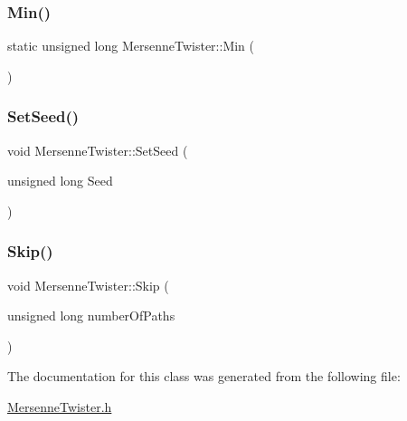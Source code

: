\subsubsection{\texorpdfstring{Min()}{Min()}}
{\footnotesize\ttfamily static unsigned long Mersenne\+Twister\+::\+Min (\begin{DoxyParamCaption}{ }\end{DoxyParamCaption})\hspace{0.3cm}{\ttfamily [static]}}

\hypertarget{classMersenneTwister_a92f4f907dad1c87f60f668351cdf174d}{}\label{classMersenneTwister_a92f4f907dad1c87f60f668351cdf174d} 
\subsubsection{\texorpdfstring{Set\+Seed()}{SetSeed()}}
{\footnotesize\ttfamily void Mersenne\+Twister\+::\+Set\+Seed (\begin{DoxyParamCaption}\item[{unsigned long}]{Seed }\end{DoxyParamCaption})}

\hypertarget{classMersenneTwister_acadedcfe8e29f89b5d6f6dc3e82127cc}{}\label{classMersenneTwister_acadedcfe8e29f89b5d6f6dc3e82127cc} 
\subsubsection{\texorpdfstring{Skip()}{Skip()}}
{\footnotesize\ttfamily void Mersenne\+Twister\+::\+Skip (\begin{DoxyParamCaption}\item[{unsigned long}]{number\+Of\+Paths }\end{DoxyParamCaption})}



The documentation for this class was generated from the following file\+:\begin{DoxyCompactItemize}
\item 
\hyperlink{MersenneTwister_8h}{Mersenne\+Twister.\+h}\end{DoxyCompactItemize}

